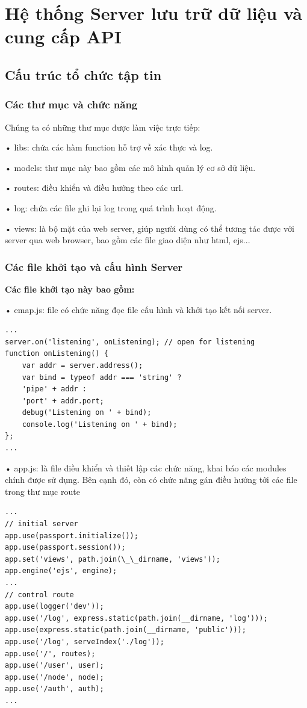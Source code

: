 \section{Hệ thống Server lưu trữ dữ liệu và cung cấp API}

\subsection{Cấu trúc tổ chức tập tin}
\subsubsection*{Các thư mục và chức năng}
Chúng ta có những thư mục được làm việc trực tiếp:

• libs: chứa các hàm function hỗ trợ về xác thực và log.

• models: thư mục này bao gồm các mô hình quản lý cơ sở dữ liệu.

• routes: điều khiển và điều hướng theo các url.

• log: chứa các file ghi lại log trong quá trình hoạt động.

• views: là bộ mặt của web server, giúp người dùng có thể tương tác được với server qua web browser, bao gồm các file giao diện như html, ejs...   


\subsubsection*{Các file khởi tạo và cấu hình Server}

\textbf{Các file khởi tạo này bao gồm:}

• emap.js: file có chức năng đọc file cấu hình và khởi tạo kết nối server.
\begin{lstlisting}[caption=emap.js]
...
server.on('listening', onListening); // open for listening
function onListening() {
	var addr = server.address();
	var bind = typeof addr === 'string' ?
	'pipe' + addr :
	'port' + addr.port;
	debug('Listening on ' + bind);
	console.log('Listening on ' + bind);
};
...
\end{lstlisting}

• app.js: là file điều khiển và thiết lập các chức năng, khai báo các modules chính được sử dụng. Bên cạnh đó, còn có chức năng gán điều hướng tới các file trong thư mục route
\begin{lstlisting}[caption=app.js]
...
// initial server
app.use(passport.initialize());
app.use(passport.session());
app.set('views', path.join(\_\_dirname, 'views'));
app.engine('ejs', engine);
...
// control route
app.use(logger('dev'));
app.use('/log', express.static(path.join(__dirname, 'log')));
app.use(express.static(path.join(__dirname, 'public')));
app.use('/log', serveIndex('./log'));
app.use('/', routes);
app.use('/user', user);
app.use('/node', node);
app.use('/auth', auth);
...
\end{lstlisting}

